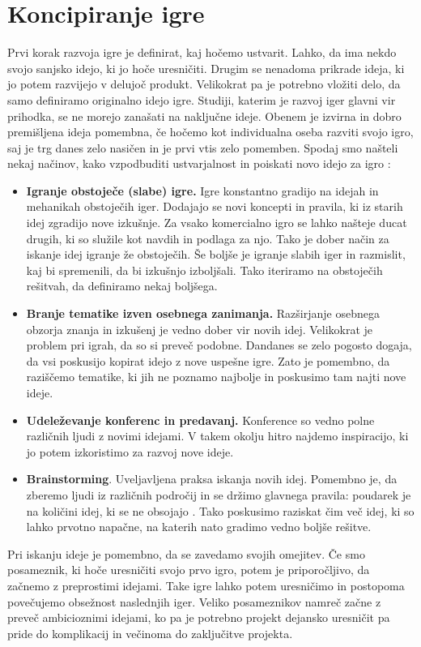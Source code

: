 \documentclass[12pt,a4paper,twoside]{book}
\begin{document}
\section{Koncipiranje igre}
Prvi korak razvoja igre je definirat, kaj hočemo ustvarit. Lahko, da ima nekdo svojo sanjsko idejo, ki jo hoče uresničiti. Drugim se nenadoma prikrade ideja, ki jo potem razvijejo v delujoč produkt. Velikokrat pa je potrebno vložiti delo, da samo definiramo originalno idejo igre. Studiji, katerim je razvoj iger glavni vir prihodka, se ne morejo zanašati na naključne ideje. Obenem je izvirna in dobro premišljena ideja pomembna, če hočemo kot individualna oseba razviti svojo igro, saj je trg danes zelo nasičen in je prvi vtis zelo pomemben. Spodaj smo našteli nekaj načinov, kako vzpodbuditi ustvarjalnost in poiskati novo idejo za igro \cite{rogers2014level}: 
\begin{itemize}
	\item \textbf{Igranje obstoječe (slabe) igre.} Igre konstantno gradijo na idejah in mehanikah obstoječih iger. Dodajajo se novi koncepti in pravila, ki iz starih idej zgradijo nove izkušnje. Za vsako komercialno igro se lahko našteje ducat drugih, ki so služile kot navdih in podlaga za njo. Tako je dober način za iskanje idej igranje že obstoječih. Še boljše je igranje slabih iger in razmislit, kaj bi spremenili, da bi izkušnjo izboljšali. Tako iteriramo na obstoječih rešitvah, da definiramo nekaj boljšega.
	\item \textbf{Branje tematike izven osebnega zanimanja.} Razširjanje osebnega obzorja znanja in izkušenj je vedno dober vir novih idej. Velikokrat je problem pri igrah, da so si preveč podobne. Dandanes se zelo pogosto dogaja, da vsi poskusijo kopirat idejo z nove uspešne igre. Zato je pomembno, da raziščemo tematike, ki jih ne poznamo najbolje in poskusimo tam najti nove ideje.
	\item \textbf{Udeleževanje konferenc in predavanj.} Konference so vedno polne različnih ljudi z novimi idejami. V takem okolju hitro najdemo inspiracijo, ki jo potem izkoristimo za razvoj nove ideje.
	\item \textbf{Brainstorming}. Uveljavljena praksa iskanja novih idej. Pomembno je, da zberemo ljudi iz različnih področij in se držimo glavnega pravila: poudarek je na količini idej, ki se ne obsojajo \cite{osborn1953applied}. Tako poskusimo raziskat čim več idej, ki so lahko prvotno napačne, na katerih nato gradimo vedno boljše rešitve.
\end{itemize}
Pri iskanju ideje je pomembno, da se zavedamo svojih omejitev. Če smo posameznik, ki hoče uresničiti svojo prvo igro, potem je priporočljivo, da začnemo z preprostimi idejami. Take igre lahko potem uresničimo in postopoma povečujemo obsežnost naslednjih iger. Veliko posameznikov namreč začne z preveč ambicioznimi idejami, ko pa je potrebno projekt dejansko uresničit pa pride do komplikacij in večinoma do zaključitve projekta.
\end{document}
